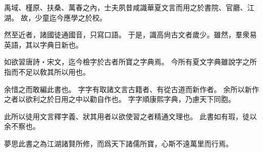 禹域、槿原、扶桑、萬春之內，士夫夙昔咸識華夏文言而用之於書院、官廳、江湖。
故，少童迄今應學之於校。

然至近者，諸國徒通國音，只寫口語。
于是，識高尙古文者歲少。雖然，羣衆易英語，其以字典日新也。

如欲習唐詩・宋文，迄今檢字於古者所寶之字典焉。
今所有夏文字典雖說字之所指而不足以敎其所以用也。

余惜之而敢編此書也。
字字有取諸文言古籍者、有從古道而新作者。
余所以新作之者以欲利之於日用之中以勸自作也。
字字順康熙字典，乃慮天下同胞。

此所以徒用文言釋字義、狀其用者以欲使習之者精通文理也。
此書如有瑕，徒以余不察也。

夢思此書之為江湖諸賢所修，而爲天下諸儒所寶，心斯不遠萬里而行焉。
